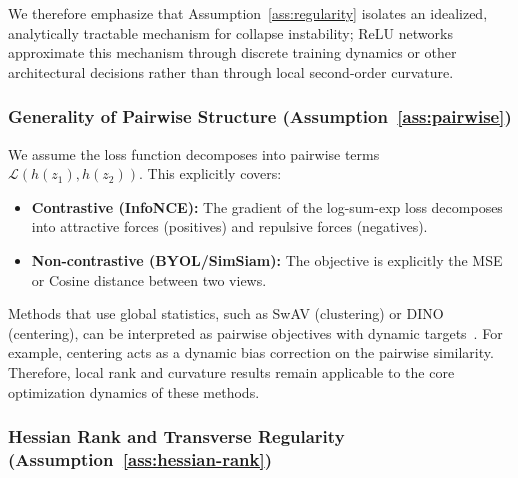 \documentclass{article}
\theoremstyle{plain}
\theoremstyle{definition}
\theoremstyle{remark}
\begin{document}
We therefore emphasize that Assumption~\ref{ass:regularity} isolates an idealized, analytically tractable mechanism for collapse instability; ReLU networks approximate this mechanism through discrete training dynamics or other architectural decisions rather than through local second-order curvature.

\subsubsection{Generality of Pairwise Structure (Assumption~\ref{ass:pairwise})}
\label{app:pairwise}

We assume the loss function decomposes into pairwise terms $\mathcal{L}(h(z_1), h(z_2))$. This explicitly covers:
\begin{itemize}
    \item \textbf{Contrastive (InfoNCE):} The gradient of the log-sum-exp loss decomposes into attractive forces (positives) and repulsive forces (negatives).
    \item \textbf{Non-contrastive (BYOL/SimSiam):} The objective is explicitly the MSE or Cosine distance between two views.
\end{itemize}
Methods that use global statistics, such as SwAV (clustering) or DINO (centering), can be interpreted as pairwise objectives with dynamic targets~\citep{caron2021unsupervised, caron2021emerging}. For example, centering acts as a dynamic bias correction on the pairwise similarity. Therefore, local rank and curvature results remain applicable to the core optimization dynamics of these methods.

\subsubsection{Hessian Rank and Transverse Regularity (Assumption~\ref{ass:hessian-rank})}
\end{document}

